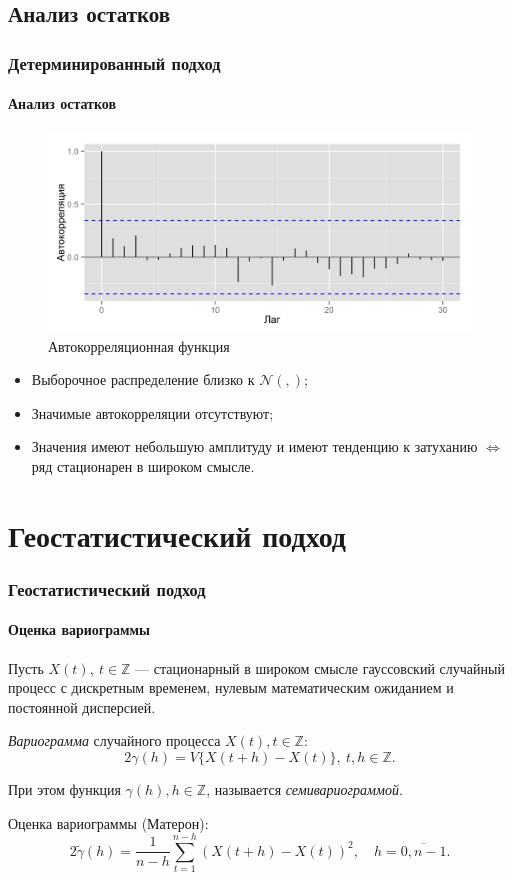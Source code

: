 \documentclass{beamer}
\newcommand{\inp}[1]{}
\newcommand{\descriptive}[2]{\inp{#1/descriptive/#2}}
\newcommand{\resnormaldistr}{$\mathcal{N}(\descriptive{residual}{mean}, \descriptive{residual}{variance})$}
\begin{document}
\subsection{Анализ остатков}
\begin{frame}
  \frametitle{Детерминированный подход}
  \framesubtitle{Анализ остатков}
  \begin{figure}[h]
    \includegraphics[width=0.7\linewidth]{../../figures/residual/acf.png}
    \caption{Автокорреляционная функция}
  \end{figure}
  
  {\small
  \begin{itemize}
    \item Выборочное распределение близко к \resnormaldistr;
    \item Значимые автокорреляции отсутствуют;
    \item Значения имеют небольшую амплитуду и имеют тенденцию к затуханию $ \Leftrightarrow $ ряд стационарен в широком смысле.
  \end{itemize}
  }
\end{frame}

\section{Геостатистический подход}
\begin{frame}
  \frametitle{Геостатистический подход}
  \framesubtitle{Оценка вариограммы}
  
  Пусть $ X(t),~ t \in \mathbb{Z} $ --- стационарный в широком смысле гауссовский случайный процесс с дискретным временем, нулевым математическим ожиданием и постоянной дисперсией.
  \begin{Definition}
    \textit{Вариограмма} случайного процесса $ X(t), t \in \mathbb{Z} $:
    \begin{equation}
        2 \gamma (h) = V \{ X(t + h) - X(t) \},~ t, h \in \mathbb{Z}.
    \end{equation}

    При этом функция $ \gamma (h), h \in \mathbb{Z} $, называется \textit{семивариограммой}.
  \end{Definition}
  Оценка вариограммы (Матерон):
  \begin{equation}
    \label{eq:matheron}
    2 \tilde{\gamma}(h) = \frac{1}{n - h} \sum_{t = 1}^{n - h}(X(t + h) - X(t))^2, \quad h = \overline{0, n - 1}.
  \end{equation}
\end{frame}
\end{document}
